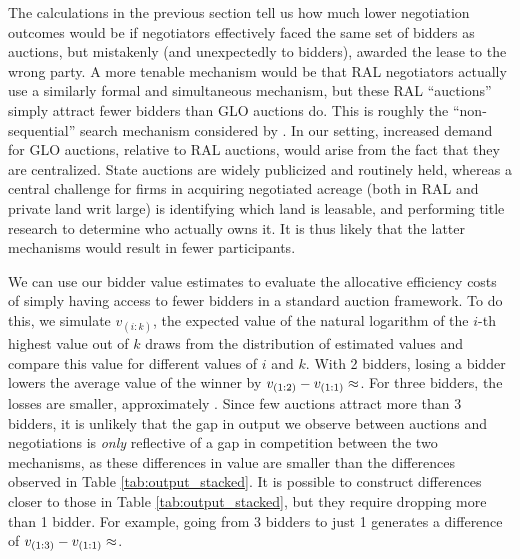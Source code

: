\documentclass[12pt]{article}
\newcommand{\inputy}[1]{\unskip}
\begin{document}
The calculations in the previous section tell us how much lower negotiation outcomes would be if negotiators effectively faced the same set of bidders as auctions, but mistakenly (and unexpectedly to bidders), awarded the lease to the wrong party. A more tenable mechanism would be that RAL negotiators actually use a similarly formal and simultaneous mechanism, but these RAL ``auctions'' simply attract fewer bidders than GLO auctions do. This is roughly the ``non-sequential'' search mechanism considered by \cite{salz_intermediation_2017}. In our setting, increased demand for GLO auctions, relative to RAL auctions, would arise from the fact that they are centralized. State auctions are widely publicized and routinely held, whereas a central challenge for firms in acquiring negotiated acreage (both in RAL and private land writ large) is identifying which land is leasable, and performing title research to determine who actually owns it. It is thus likely that the latter mechanisms would result in fewer participants.  

We can use our bidder value estimates to evaluate the allocative efficiency costs of simply having access to fewer bidders in a standard auction framework.  To do this, we simulate $v_{(i:k)}$, the expected value of the natural logarithm of the $i$-th highest value out of $k$ draws from the distribution of estimated values and compare this value for different values of $i$ and $k$.  With 2 bidders, losing a bidder lowers the average value of the winner by $v_{(1:2)} - v_{(1:1)} \approx \inputy{../output/estimates/drop_bidder_v_21.tex}$.  For three bidders, the losses are smaller, approximately \inputy{../output/estimates/drop_bidder_v_32.tex}.  Since few auctions attract more than 3 bidders, it is unlikely that the gap in output we observe between auctions and negotiations is \textit{only} reflective of a gap in competition between the two mechanisms, as these differences in value are smaller than the differences observed in Table \ref{tab:output_stacked}.  It is possible to construct differences closer to those in Table \ref{tab:output_stacked}, but they require dropping more than 1 bidder.  For example, going from 3 bidders to just 1 generates a difference of $v_{(1:3)} - v_{(1:1)} \approx \inputy{../output/estimates/drop_bidder_v_31.tex}$. 
\end{document}
